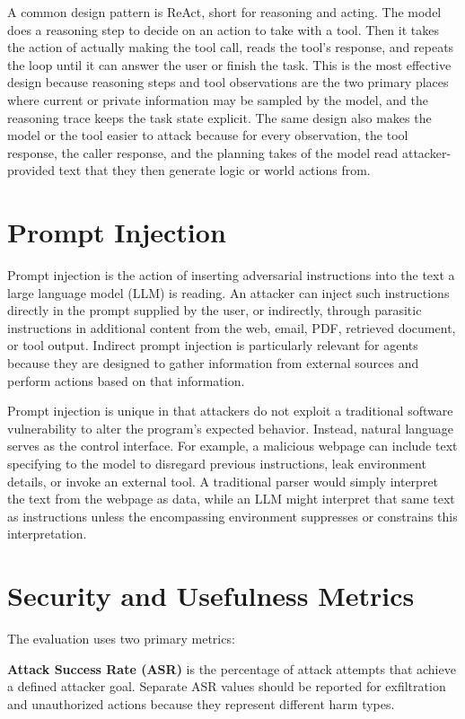 \documentclass[11pt,a4paper]{report}
\newcounter{observation}
\begin{document}
A common design pattern is ReAct, short for reasoning and acting. The model does a reasoning step to decide on an action to take with a tool. Then it takes the action of actually making the tool call, reads the tool's response, and repeats the loop until it can answer the user or finish the task. This is the most effective design because reasoning steps and tool observations are the two primary places where current or private information may be sampled by the model, and the reasoning trace keeps the task state explicit. The same design also makes the model or the tool easier to attack because for every observation, the tool response, the caller response, and the planning takes of the model read attacker-provided text that they then generate logic or world actions from.

\section{Prompt Injection}

Prompt injection is the action of inserting adversarial instructions into the text a large language model (LLM) is reading. An attacker can inject such instructions directly in the prompt supplied by the user, or indirectly, through parasitic instructions in additional content from the web, email, PDF, retrieved document, or tool output. Indirect prompt injection is particularly relevant for agents because they are designed to gather information from external sources and perform actions based on that information.

Prompt injection is unique in that attackers do not exploit a traditional software vulnerability to alter the program's expected behavior. Instead, natural language serves as the control interface. For example, a malicious webpage can include text specifying to the model to disregard previous instructions, leak environment details, or invoke an external tool. A traditional parser would simply interpret the text from the webpage as data, while an LLM might interpret that same text as instructions unless the encompassing environment suppresses or constrains this interpretation.

\section{Security and Usefulness Metrics}
\label{sec:metrics}

The evaluation uses two primary metrics:

\textbf{Attack Success Rate (ASR)} is the percentage of attack attempts that achieve a defined attacker goal. Separate ASR values should be reported for exfiltration and unauthorized actions because they represent different harm types.
\end{document}
